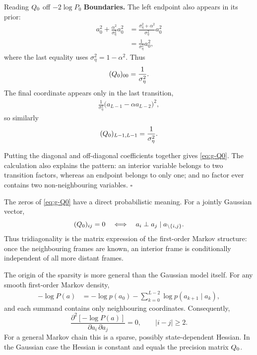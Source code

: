 \begin{toolbox}{Reading $Q_0$ off $-2\log P_0$}
\medskip
\noindent\textbf{Boundaries.}
The left endpoint also appears in its prior:
\begin{align}
  a_0^2
  +
  \frac{\alpha^2}{\sigma_\eta^2}a_0^2
  &=
  \frac{\sigma_\eta^2+\alpha^2}
       {\sigma_\eta^2}a_0^2\\
  &=
  \frac{1}{\sigma_\eta^2}a_0^2,
\end{align}
where the last equality uses
$\sigma_\eta^2=1-\alpha^2$. Thus
\begin{equation}
  (Q_0)_{00}
  =
  \frac{1}{\sigma_\eta^2}.
\end{equation}
The final coordinate appears only in the last transition,
\begin{align}
  \frac{1}{\sigma_\eta^2}
  \bigl(a_{L-1}-\alpha a_{L-2}\bigr)^2,
\end{align}
so similarly
\begin{equation}
  (Q_0)_{L-1,L-1}
  =
  \frac{1}{\sigma_\eta^2}.
\end{equation}

Putting the diagonal and off-diagonal coefficients together gives
\eqref{eq:g-Q0}. The calculation also explains the pattern: an interior
variable belongs to two transition factors, whereas an endpoint belongs to
only one; and no factor ever contains two non-neighbouring variables.
\hfill$\square$
\end{toolbox}

The zeros of \eqref{eq:g-Q0} have a direct probabilistic meaning. For a
jointly Gaussian vector,
\begin{equation}
  (Q_0)_{ij}=0
  \quad\Longleftrightarrow\quad
  a_i\perp a_j
  \mid
  a_{\setminus\{i,j\}}.
  \label{eq:g-precision-ci}
\end{equation}
Thus tridiagonality is the matrix expression of the first-order Markov
structure: once the neighbouring frames are known, an interior frame is
conditionally independent of all more distant frames.

The origin of the sparsity is more general than the Gaussian model itself.
For any smooth first-order Markov density,
\begin{align}
  -\log P(a)
  &=
  -\log p(a_0)
  -
  \sum_{k=0}^{L-2}
  \log p(a_{k+1}\mid a_k),
\end{align}
and each summand contains only neighbouring coordinates. Consequently,
\begin{equation}
  \frac{\partial^2[-\log P(a)]}
       {\partial a_i\,\partial a_j}
  =0,
  \qquad |i-j|\geq2.
  \label{eq:g-markov-hessian-sparsity}
\end{equation}
For a general Markov chain this is a sparse, possibly state-dependent
Hessian. In the Gaussian case the Hessian is constant and equals the
precision matrix $Q_0$.

